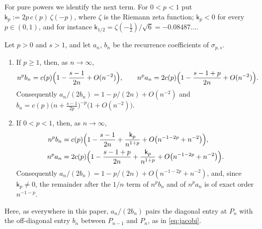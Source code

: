 For pure powers we identify the next term. For $0<p<1$ put $\mathsf k_p:=2p\,c(p)\,\zeta(-p)$, where $\zeta$ is the
Riemann zeta function; $\mathsf k_p<0$ for every $p\in(0,1)$, and for instance
$\mathsf k_{1/2}=\zeta(-\frac12)/\sqrt6=-0.08487\ldots$.

\begin{theorem}\label{thm:onen}
Let $p>0$ and $s>1$, and let $a_n$, $b_n$ be the recurrence coefficients of $\sigma_{p,s}$.
\begin{enumerate}
\item[\textup{(i)}] If $p\ge1$, then, as $n\to\infty$,
\[
  n^pb_n=c(p)\Bigl(1-\frac{s-1}{2n}+O(n^{-2})\Bigr),\qquad
  n^pa_n=2c(p)\Bigl(1-\frac{s-1+p}{2n}+O(n^{-2})\Bigr).
\]
Consequently $a_n/(2b_n)=1-p/(2n)+O(n^{-2})$ and $b_n=c(p)\bigl(n+\frac{s-1}{2p}\bigr)^{-p}\bigl(1+O(n^{-2})\bigr)$.
\item[\textup{(ii)}] If $0<p<1$, then, as $n\to\infty$,
\begin{align*}
  n^pb_n&=c(p)\Bigl(1-\frac{s-1}{2n}+\frac{\mathsf k_p}{n^{1+p}}+O\bigl(n^{-1-2p}+n^{-2}\bigr)\Bigr),\\
  n^pa_n&=2c(p)\Bigl(1-\frac{s-1+p}{2n}+\frac{\mathsf k_p}{n^{1+p}}+O\bigl(n^{-1-2p}+n^{-2}\bigr)\Bigr).
\end{align*}
Consequently $a_n/(2b_n)=1-p/(2n)+O(n^{-1-2p}+n^{-2})$, and, since $\mathsf k_p\ne0$, the remainder after the $1/n$ term
of $n^pb_n$ and of $n^pa_n$ is of exact order $n^{-1-p}$.
\end{enumerate}
\end{theorem}

Here, as everywhere in this paper, $a_n/(2b_n)$ pairs the diagonal entry at $P_n$ with the off-diagonal entry $b_n$
between $P_{n-1}$ and $P_n$, as in \eqref{eq:jacobi}.

